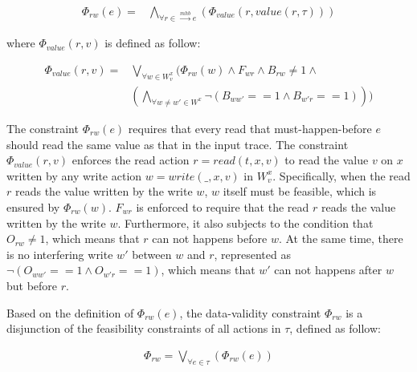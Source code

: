 \documentclass[preprint, numbers, 10pt]{sigplanconf}
\begin{document}
\begin{equation}
\begin{aligned}
\Phi_{rw}(e) ={} & \bigwedge_{\forall r\in \stackrel{mhb}{\longrightarrow} e} 
					(\Phi_{value}(r,value(r,\tau)))
\end{aligned}
\end{equation} 

where $\Phi_{value}(r,v)$ is defined as follow: 

\begin{equation}
\begin{aligned}
\Phi_{value}(r,v) ={} & \bigvee_{\forall w\in W_v^x} (\Phi_{rw}(w)\wedge F_{wr}\wedge 
					  B_{rw}\neq 1\wedge \\
					& (\bigwedge_{\forall w\neq w'\in W^x}\neg (B_{ww'}==1\wedge B_{w'r}==1)))
\end{aligned}
\end{equation}

The constraint $\Phi_{rw}(e)$ requires that every read that must-happen-before 
$e$ should read the same value as that in the input trace. 
The constraint $\Phi_{value}(r,v)$ enforces the read action $r=read(t ,x,v)$ 
to read the value $v$ on $x$ written by any write action $w =write(\_,x,v)$ in $W^x_v$.
Specifically, when the read $r$ reads the value written by the write $w$,
$w$ itself must be feasible, which is ensured by $\Phi_{rw}(w)$. 
$F_{wr}$ is enforced to require that the read $r$ reads the value written by the write $w$. 
Furthermore, it also subjects to the condition that $O_{rw}\neq 1$, which means that $r$ can
not happens before $w$. %
At the same time, there is no interfering write $w'$ between $w$ and $r$, represented as 
$\neg (O_{ww'}==1\wedge O_{w'r}==1)$, which means that 
$w'$ can not happens after $w$ but before $r$.

Based on the definition of $\Phi_{rw}(e)$, the data-validity constraint $\Phi_{rw}$
is a disjunction of the feasibility constraints of all actions in $\tau$, defined as follow:

\begin{equation}
\begin{aligned}
\Phi_{rw} = \bigvee_{\forall e\in \tau} (\Phi_{rw}(e))
\end{aligned}
\end{equation} 
\end{document}
